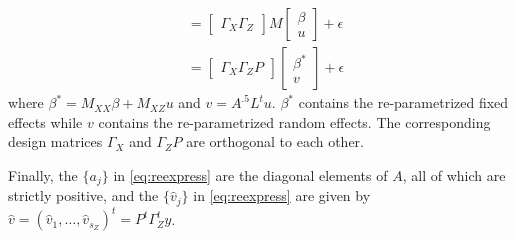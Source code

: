 \documentclass{report}
\begin{document}
\begin{enumerate}
\begin{equation*}
\begin{split}
        &= \begin{bmatrix} \Gamma_X  \Gamma_Z \end{bmatrix} M \begin{bmatrix} \beta \\ u \end{bmatrix} + \epsilon\\
        &= \begin{bmatrix} \Gamma_X \Gamma_ZP \end{bmatrix} \begin{bmatrix} \beta^* \\ v \end{bmatrix} + \epsilon
      \end{split}
    \end{equation*}
    where $\beta^* = M_{XX}\beta + M_{XZ}u$ and $v = A^{.5}L^t u$.  $\beta^*$ contains the re-parametrized
    fixed effects while $v$ contains the re-parametrized random effects.  The corresponding design matrices
    $\Gamma_X$ and $\Gamma_Z P$ are orthogonal to each other.
\end{enumerate}
Finally, the $\{a_j\}$ in \eqref{eq:reexpress} are the diagonal elements of $A$, all of which are strictly positive, and the $\{\hat v_j\}$ in \eqref{eq:reexpress} are given by $\hat v = (\hat v_1, \dots, \hat v_{s_Z})^t = P^t \Gamma_Z^t y$.



\end{document}
